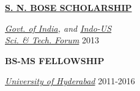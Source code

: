 {\begin{minipage}[t][\textheight-2\fboxsep-2\fboxrule][t]{0.28\textwidth}
\begin{flushleft}
\textbf{\href{https://www.iusstf.org/program/sn-bose-scholars-program}{\uppercase{S. N. Bose Scholarship}}} \par
\textit{\href{http://www.dst.gov.in}{Govt. of India}, and \href{www.iusstf.org}{Indo-US \\ Sci. \& Tech. Forum}} \hfill 2013

\textbf{\uppercase{BS-MS Fellowship}} \par
\textit{\href{http://www.uohyd.ac.in}{University of Hyderabad}} \hfill 2011-2016

\end{flushleft}
\end{minipage}}

